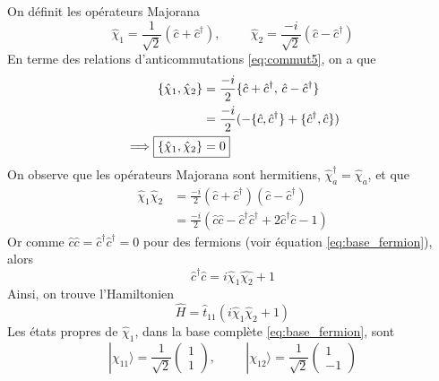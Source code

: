 \documentclass{article}
\numberwithin{equation}{section}
\theoremstyle{solution}
\begin{document}
\subsection{}
On définit les opérateurs Majorana
\begin{equation}
        \hat{\chi}_1 = \frac{1}{\sqrt{2}}(\hat{c} + \hat{c}^{\dagger}), \hspace{1cm} \hat{\chi}_2= \frac{-i}{\sqrt{2}}(\hat{c} - \hat{c}^{\dagger}) 
\end{equation} 
En terme des relations d'anticommutations \eqref{eq:commut5}, on a que
\begin{align*}
        \{\hat{\chi}_1, \hat{\chi}_2\} &= \frac{-i}{2} \{\hat{c} + \hat{c}^{\dagger},\, \hat{c} - \hat{c}^{\dagger}\}  \\
                &= \frac{-i}{2}(-\{\hat{c}, \hat{c}^{\dagger}\} + \{\hat{c}^{\dagger}, \hat{c}\}) \\
\implies     \Aboxed{ \{\hat{\chi}_1, \hat{\chi}_2\} &= 0 } 
\end{align*}
On observe que les opérateurs Majorana sont hermitiens, $\hat{\chi}_{a}^{\dagger} = \hat{\chi}_a$, et que 
\begin{align*}
        \hat{\chi}_1\hat{\chi}_2 &= \frac{-i}{2}(\hat{c} + \hat{c}^{\dagger})(\hat{c} - \hat{c}^{\dagger}) \\
        &= \frac{-i}{2}(\hat{c}\hat{c} - \hat{c}^{\dagger}\hat{c}^{\dagger} + 2\hat{c}^{\dagger}\hat{c} - 1)
\end{align*}
Or comme $\hat{c}\hat{c} = \hat{c}^{\dagger}\hat{c}^{\dagger} = 0$ pour des fermions (voir équation \eqref{eq:base_fermion}), alors
\begin{equation}
        \hat{c}^{\dagger}\hat{c} = i \hat{\chi}_1\hat{\chi_2} + 1
\end{equation} 
Ainsi, on trouve l'Hamiltonien
\begin{equation}
        \boxed{\hat{H} = \hat{t}_{11}(i\hat{\chi}_1\hat{\chi}_2 + 1 )} 
\end{equation} 
Les états propres de $\hat{\chi}_1$, dans la base complète \eqref{eq:base_fermion}, sont
\begin{equation}
        \boxed{| \chi_{11} \rangle = \frac{1}{\sqrt{2}} \begin{pmatrix}
                1 \\ 1
        \end{pmatrix}
        ,
        \hspace{1cm}
        | \chi_{12} \rangle = \frac{1}{\sqrt{2}}\begin{pmatrix}
                1 \\ -1
        \end{pmatrix}
}
\end{equation} 
\end{document}
